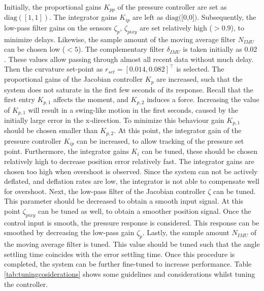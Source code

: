 Initially, the proportional gains $K_{pp}$ of the pressure controller are set as $\text{diag}([1,1])$. The integrator gains $K_{ip}$ are left as $\text{diag([0,0])}$. Subsequently, the low-pass filter gains on the sensors $\zeta_p$, $\zeta_{pixy}$ are set relatively high ($>0.9$), to minimize delays. Likewise, the sample amount of the moving average filter $N_{IMU}$ can be chosen low ($<5$). The complementary filter $\delta_{IMU}$ is taken initially as 0.02 \cite{compfilter}. These values allow passing through almost all recent data without much delay. Then the curvature set-point as $r_{set} = [0.014,0.082]^\top$ is selected. The proportional gains of the Jacobian controller $K_p$ are increased, such that the system does not saturate in the first few seconds of its response. Recall that the first entry $K_{p,1}$ affects the moment, and $K_{p,2}$ induces a force. Increasing the value of $K_{p,1}$ will result in a swing-like motion in the first seconds, caused by the initially large error in the x-direction. To minimize this behaviour gain $K_{p,1}$ should be chosen smaller than $K_{p,2}$. At this point, the integrator gain of the pressure controller $K_{ip}$ can be increased, to allow tracking of the pressure set point. Furthermore, the integrator gains $K_i$ can be tuned, these should be chosen relatively high to decrease position error relatively fast. The integrator gains are chosen too high when overshoot is observed. Since the system can not be actively deflated, and deflation rates are low, the integrator is not able to compensate well for overshoot. Next, the low-pass filter of the Jacobian controller $\zeta$ can be tuned. This parameter should be decreased to obtain a smooth input signal. At this point $\zeta_{pixy}$ can be tuned as well, to obtain a smoother position signal. Once the control input is smooth, the pressure response is considered. This response can be smoothed by decreasing the low-pass gain $\zeta_p$. Lastly, the sample amount $N_{IMU}$ of the moving average filter is tuned. This value should be tuned such that the angle settling time coincides with the error settling time. Once this procedure is completed, the system can be further fine-tuned to increase performance. Table \ref{tab:tuningcosiderations} shows some guidelines and considerations whilst tuning the controller.


